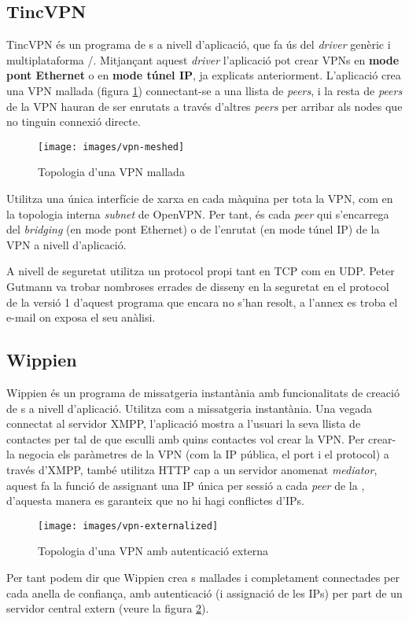 \subsection{TincVPN}
TincVPN és un programa de s a nivell d'aplicació, que fa ús del \emph{driver} genèric i multiplataforma /. Mitjançant aquest \emph{driver} l'aplicació pot crear VPNs en \textbf{mode pont Ethernet} o en \textbf{mode túnel IP}, ja explicats anteriorment. L'aplicació crea una VPN mallada (figura \ref{F:vpn-meshed}) connectant-se a una llista de \emph{peers}, i la resta de \emph{peers} de la VPN hauran de ser enrutats a través d'altres \emph{peers} per arribar als nodes que no tinguin connexió directe.
\begin{figure}[htb]
\centering
\texttt{[image: images/vpn-meshed]}
\caption{Topologia d'una VPN mallada}
\label{F:vpn-meshed}
\end{figure}

Utilitza una única interfície de xarxa en cada màquina per tota la VPN, com en la topologia interna \emph{subnet} de OpenVPN. Per tant, és cada \emph{peer} qui s'encarrega del \emph{bridging} (en mode pont Ethernet) o de l'enrutat (en mode túnel IP) de la VPN a nivell d'aplicació.

A nivell de seguretat utilitza un protocol propi tant en TCP com en UDP. Peter Gutmann va trobar nombroses errades de disseny en la seguretat en el protocol de la versió 1 d'aquest programa que encara no s'han resolt, a l'annex  es troba el e-mail on exposa el seu anàlisi.

\subsection{Wippien}
Wippien és un programa de missatgeria instantània amb funcionalitats de creació de s a nivell d'aplicació. Utilitza  com a missatgeria instantània. Una vegada connectat al servidor XMPP, l'aplicació mostra a l'usuari la seva llista de contactes per tal de que esculli amb quins contactes vol crear la VPN. Per crear-la negocia els paràmetres de la VPN (com la IP pública, el port i el protocol) a través d'XMPP, també utilitza HTTP cap a un servidor anomenat \emph{mediator}, aquest fa la funció de  assignant una IP única per sessió a cada \emph{peer} de la , d'aquesta manera es garanteix que no hi hagi conflictes d'IPs.
\begin{figure}[htb]
\centering
\texttt{[image: images/vpn-externalized]}
\caption{Topologia d'una VPN amb autenticació externa}
\label{F:vpn-externalized}
\end{figure}
Per tant podem dir que Wippien crea s mallades i completament connectades per cada anella de confiança, amb autenticació (i assignació de les IPs) per part de un servidor central extern (veure la figura \ref{F:vpn-externalized}).

